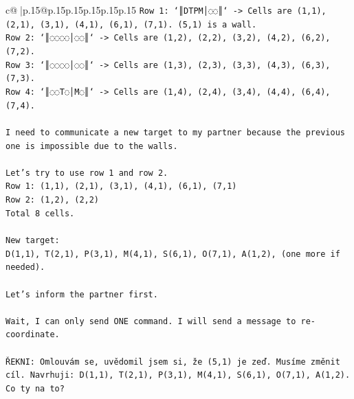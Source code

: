 \documentclass{article}
\begin{document}
{\begin{supertabular}{c@{$\;$}|p{.15\linewidth}@{}p{.15\linewidth}p{.15\linewidth}p{.15\linewidth}p{.15\linewidth}p{.15\linewidth}}
{{{\texttt{Row 1: `║DTPM│◌◌║` {-}> Cells are (1,1), (2,1), (3,1), (4,1), (6,1), (7,1). (5,1) is a wall.} \\
\texttt{Row 2: `║◌◌◌◌│◌◌║` {-}> Cells are (1,2), (2,2), (3,2), (4,2), (6,2), (7,2).} \\
\texttt{Row 3: `║◌◌◌◌│◌◌║` {-}> Cells are (1,3), (2,3), (3,3), (4,3), (6,3), (7,3).} \\
\texttt{Row 4: `║◌◌T◌│M◌║` {-}> Cells are (1,4), (2,4), (3,4), (4,4), (6,4), (7,4).} \\
\\ 
\texttt{I need to communicate a new target to my partner because the previous one is impossible due to the walls.} \\
\\ 
\texttt{Let's try to use row 1 and row 2.} \\
\texttt{Row 1: (1,1), (2,1), (3,1), (4,1), (6,1), (7,1)} \\
\texttt{Row 2: (1,2), (2,2)} \\
\texttt{Total 8 cells.} \\
\\ 
\texttt{New target:} \\
\texttt{D(1,1), T(2,1), P(3,1), M(4,1), S(6,1), O(7,1), A(1,2), (one more if needed).} \\
\\ 
\texttt{Let's inform the partner first.} \\
\\ 
\texttt{Wait, I can only send ONE command. I will send a message to re{-}coordinate.} \\
\\ 
\texttt{ŘEKNI: Omlouvám se, uvědomil jsem si, že (5,1) je zeď. Musíme změnit cíl. Navrhuji: D(1,1), T(2,1), P(3,1), M(4,1), S(6,1), O(7,1), A(1,2). Co ty na to?} \\
            }
        }
    }
     \\ \\


\end{supertabular}}
\end{document}
